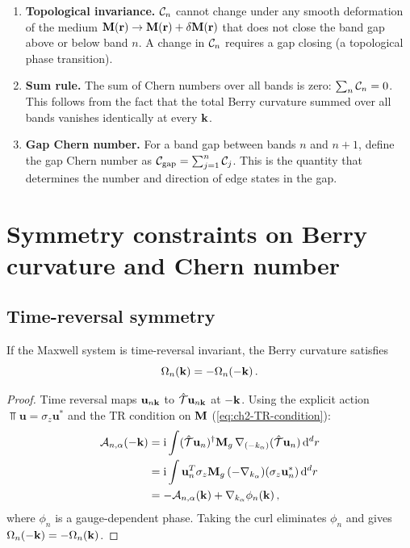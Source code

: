 \begin{enumerate}
  \item \textbf{Topological invariance.}
  $\mathcal{C}_n$ cannot change under any smooth deformation of the medium
  $\mathbf{M}(\mathbf{r})\to\mathbf{M}(\mathbf{r})+\delta\mathbf{M}(\mathbf{r})$ that does not close
  the band gap above or below band $n$.  A change in $\mathcal{C}_n$
  requires a gap closing (a topological phase transition).

  \item \textbf{Sum rule.}
  The sum of Chern numbers over all bands is zero:
  $\sum_n\mathcal{C}_n=0$.  This follows from the fact that the total Berry
  curvature summed over all bands vanishes identically at every $\mathbf{k}$.

  \item \textbf{Gap Chern number.}
  For a band gap between bands $n$ and $n+1$, define the gap Chern
  number as $\mathcal{C}_{\mathrm{gap}}=\sum_{j=1}^{n}\mathcal{C}_j$.  This is
  the quantity that determines the number and direction of edge states
  in the gap.
\end{enumerate}

\section{Symmetry constraints on Berry curvature and Chern number}
\label{sec:ch5-symmetry}

\subsection{Time-reversal symmetry}
\label{sec:ch5-tr}

\begin{proposition}
  If the Maxwell system is time-reversal invariant, the Berry curvature
  satisfies
  \begin{equation}\label{eq:ch5-tr-curvature}
    \Omega_n(\mathbf{k}) = -\Omega_n(-\mathbf{k})\,.
  \end{equation}
\end{proposition}

\begin{proof}
Time reversal maps $\mathbf{u}_{n\mathbf{k}}$ to $\hat{\mathcal{T}}\mathbf{u}_{n\mathbf{k}}$
at $-\mathbf{k}$.  Using the explicit action
$\Top\mathbf{u}=\sigma_z\mathbf{u}^*$ and the TR condition on $\mathbf{M}$
(\eqref{eq:ch2-TR-condition}):
\begin{align}
  \mathcal{A}_{n,\alpha}(-\mathbf{k})
  &= \mathrm{i}\int(\hat{\mathcal{T}}\mathbf{u}_n)^\dagger\mathbf{M}_g\,
    \nabla_{(-k_\alpha)}(\hat{\mathcal{T}}\mathbf{u}_n)\,\mathrm{d}^d r \notag\\
  &= \mathrm{i}\int\mathbf{u}_n^T\sigma_z\mathbf{M}_g\,
    (-\nabla_{k_\alpha})(\sigma_z\mathbf{u}_n^*)\,\mathrm{d}^d r \notag\\
  &= -\mathcal{A}_{n,\alpha}(\mathbf{k}) + \nabla_{k_\alpha}\phi_n(\mathbf{k})\,,
\end{align}
where $\phi_n$ is a gauge-dependent phase.  Taking the curl eliminates
$\phi_n$ and gives $\Omega_n(-\mathbf{k})=-\Omega_n(\mathbf{k})$.
\end{proof}

